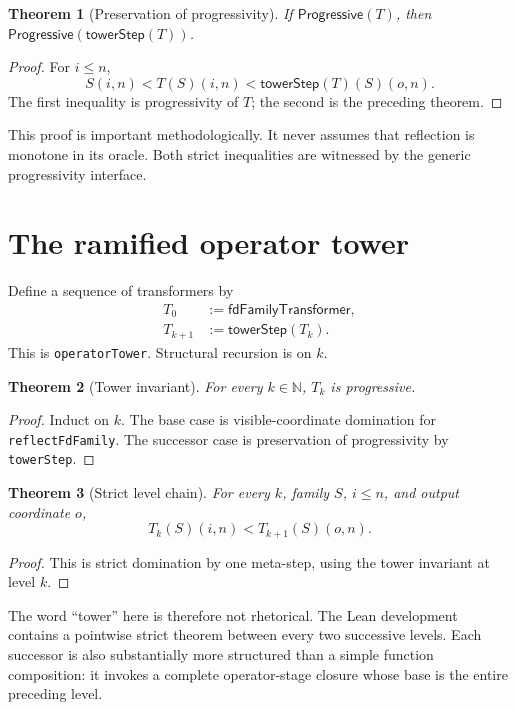 \documentclass[11pt]{article}
\newtheorem{theorem}{Theorem}[section]
\theoremstyle{definition}
\newcommand{\Nat}{\ensuremath{\mathbb{N}}}
\newcommand{\Prog}{\ensuremath{\mathsf{Progressive}}}
\newcommand{\lean}[1]{\texttt{#1}}
\newcommand{\step}{\ensuremath{\mathsf{towerStep}}}
\begin{document}
\begin{theorem}[Preservation of progressivity]
If \(\Prog(T)\), then \(\Prog(\step(T))\).
\end{theorem}
\begin{proof}
For $i\le n$,
\[
  S(i,n)<T(S)(i,n)<\step(T)(S)(o,n).
\]
The first inequality is progressivity of $T$; the second is the preceding
theorem.
\end{proof}

This proof is important methodologically.  It never assumes that reflection is
monotone in its oracle.  Both strict inequalities are witnessed by the generic
progressivity interface.

\section{The ramified operator tower}

Define a sequence of transformers by
\begin{align*}
  T_0 &:= \mathsf{fdFamilyTransformer},\\
  T_{k+1} &:= \step(T_k).
\end{align*}
This is \lean{operatorTower}.  Structural recursion is on $k$.

\begin{theorem}[Tower invariant]
For every $k\in\Nat$, $T_k$ is progressive.
\end{theorem}
\begin{proof}
Induct on $k$.  The base case is visible-coordinate domination for
\lean{reflectFdFamily}.  The successor case is preservation of progressivity
by \lean{towerStep}.
\end{proof}

\begin{theorem}[Strict level chain]
For every $k$, family $S$, $i\le n$, and output coordinate $o$,
\[
  T_k(S)(i,n)<T_{k+1}(S)(o,n).
\]
\end{theorem}
\begin{proof}
This is strict domination by one meta-step, using the tower invariant at level
$k$.
\end{proof}

The word ``tower'' here is therefore not rhetorical.  The Lean development
contains a pointwise strict theorem between every two successive levels.  Each
successor is also substantially more structured than a simple function
composition: it invokes a complete operator-stage closure whose base is the
entire preceding level.
\end{document}
